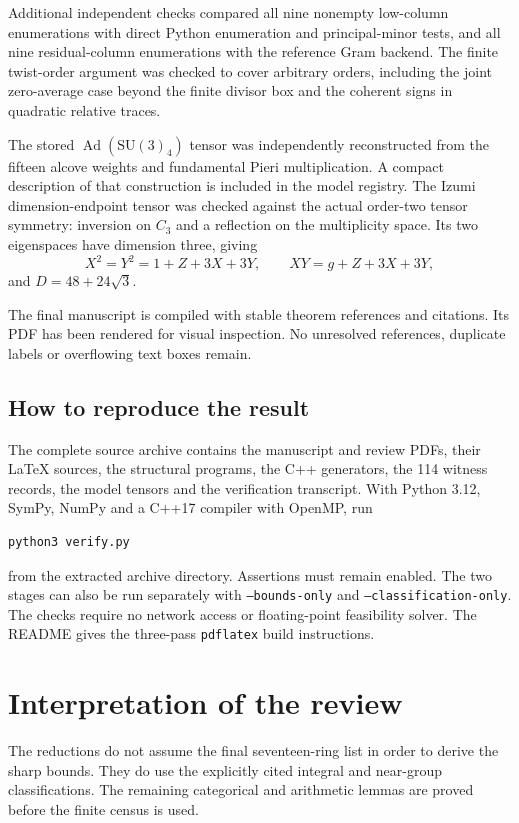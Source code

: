 \documentclass[11pt,a4paper]{article}
\newcommand{\issue}[1]{\subsection{#1}}
\begin{document}
Additional independent checks compared all nine nonempty low-column
enumerations with direct Python enumeration and principal-minor tests,
and all nine residual-column enumerations with the reference Gram
backend. The finite twist-order argument was checked to cover arbitrary
orders, including the joint zero-average case beyond the finite divisor
box and the coherent signs in quadratic relative traces.

The stored \(\operatorname{Ad}(\mathrm{SU}(3)_4)\) tensor was independently
reconstructed from the fifteen alcove weights and fundamental Pieri
multiplication. A compact description of that construction is included
in the model registry. The Izumi dimension-endpoint tensor was checked
against the actual order-two tensor symmetry: inversion on \(C_3\) and
a reflection on the multiplicity space. Its two eigenspaces have
dimension three, giving
\[
 X^2=Y^2=1+Z+3X+3Y,\qquad XY=g+Z+3X+3Y,
\]
and \(D=48+24\sqrt3\).

The final manuscript is compiled with stable theorem references and
citations. Its PDF has been rendered for visual inspection. No
unresolved references, duplicate labels or overflowing text boxes remain.

\issue{How to reproduce the result}

The complete source archive contains the manuscript and review PDFs,
their LaTeX sources, the structural programs, the C++ generators, the
114 witness records, the model tensors and the verification transcript.
With Python 3.12, SymPy, NumPy and a C++17 compiler with OpenMP, run
\begin{verbatim}
python3 verify.py
\end{verbatim}
from the extracted archive directory. Assertions must remain enabled.
The two stages can also be run separately with
\texttt{--bounds-only} and \texttt{--classification-only}.
The checks require no network access or floating-point feasibility solver.
The README gives the three-pass \texttt{pdflatex} build instructions.

\section{Interpretation of the review}

The reductions do not assume the final seventeen-ring list in order to
derive the sharp bounds. They do use the explicitly cited integral and
near-group classifications. The remaining categorical and arithmetic
lemmas are proved before the finite census is used.
\end{document}
